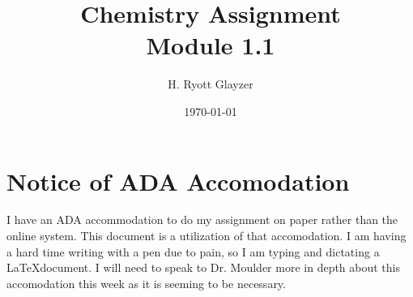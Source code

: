 \documentclass[11pt, letterpaper]{article}
\begin{document}
{
\fancyhf{}
}


\title{Chemistry Assignment \\ \large Module 1.1}
\author{H. Ryott Glayzer}
\date{\today}


\maketitle


\section*{Notice of ADA Accomodation}
I have an ADA accommodation to do my assignment on paper rather than the online system.
This document is a utilization of that accomodation.
I am having a hard time writing with a pen due to pain, so I am typing and dictating a \LaTeX document.
I will need to speak to Dr. Moulder more in depth about this accomodation this week as it is seeming to be necessary.
\end{document}
